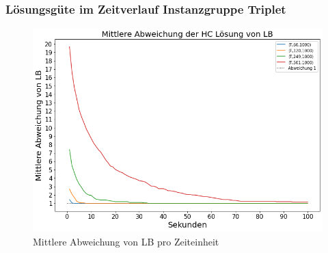 \documentclass{beamer}
\begin{document}
\begin{frame}

\frametitle{Lösungsgüte im Zeitverlauf Instanzgruppe Triplet}

\begin{figure}[!htbp]
\begin{center}
\includegraphics[scale=0.3]{img/triplet_time.png}
\end{center}
\caption{Mittlere Abweichung von LB pro Zeiteinheit}
\label{fig:architecture}
\end{figure}

\end{frame}
\end{document}
